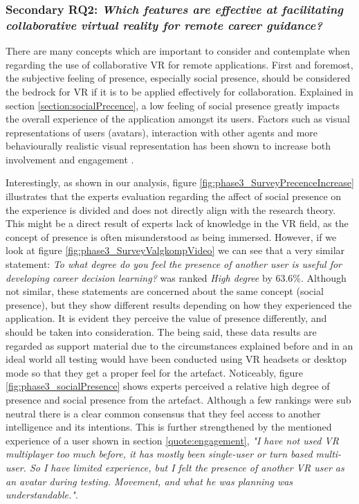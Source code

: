 \subsubsection{Secondary RQ2: \textit{Which features are effective at facilitating collaborative virtual reality for remote
career guidance?}} 
There are many concepts which are important to consider and contemplate when regarding the use of collaborative VR for remote applications. First and foremost, the subjective feeling of presence, especially social presence, should be considered the bedrock for VR if it is to be applied effectively for collaboration. Explained in section \ref{section:socialPrecence}, a low feeling of social presence greatly impacts the overall experience of the application amongst its users. Factors such as visual representations of users (avatars), interaction with other agents and more behaviourally realistic visual representation has been shown to increase both involvement and engagement \cite{skalski2007role} \cite{oh2018systematic}. 

Interestingly, as shown in our analysis, figure \ref{fig:phase3_SurveyPrecenceIncrease} illustrates that the experts evaluation regarding the affect of social presence on the experience is divided and does not directly align with the research theory. This might be a direct result of experts lack of knowledge in the VR field, as the concept of presence is often misunderstood as being immersed. However, if we look at figure \ref{fig:phase3_SurveyValgkompVideo} we can see that a very similar statement: \textit{To what degree do you feel the presence of another user is useful for developing career decision learning?} was ranked \textit{High degree} by 63.6\%. Although not similar, these statements are concerned about the same concept (social presence), but they show different results depending on how they experienced the application. It is evident they perceive the value of presence differently, and should be taken into consideration. The being said, these data results are regarded as support material due to the circumstances explained before and in an ideal world all testing would have been conducted using VR headsets or desktop mode so that they get a proper feel for the artefact. 
Noticeably,  figure \ref{fig:phase3_socialPresence} shows experts perceived a relative high degree of presence and social presence from the artefact. Although a few rankings were sub neutral there is a clear common consensus that they feel access to another intelligence and its intentions. This is further strengthened by the mentioned experience of a user shown in section \ref{quote:engagement}, 
\textit{"I have not used VR multiplayer too much before, it has mostly been single-user or turn based multi-user. So I have limited experience, but I felt the presence of another VR user as an avatar during testing.  Movement, and what he was planning was understandable."}.


